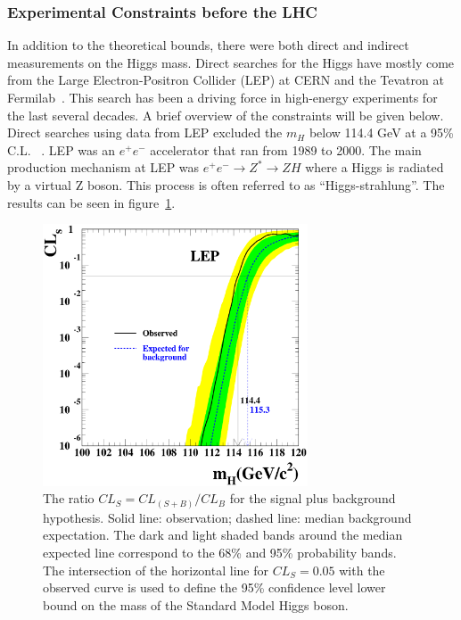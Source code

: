 \subsubsection{Experimental Constraints before the LHC}

In addition to the theoretical bounds, there were both direct and indirect measurements on the Higgs mass. Direct searches for the Higgs have mostly come from the Large Electron-Positron Collider (LEP) at CERN and the Tevatron at Fermilab~\cite{ALEPH:2010aa}. This search has been a driving force in high-energy experiments for the last several decades.  A brief overview of the constraints will be given below.
 Direct searches using data from LEP excluded the $m_H$ below 114.4 GeV at a 95\% C.L. ~\cite{Barate:2003sz}. LEP was an $e^+e^-$ accelerator that ran from 1989 to 2000. The main production mechanism at LEP was $e^+e^- \rightarrow Z^* \rightarrow ZH$ where a Higgs is radiated by a virtual Z boson.  This process is often referred to as ``Higgs-strahlung''.  The results can be seen in figure~\ref{fig:adlocls}.

\begin{figure}[htb]
\centering
\includegraphics[width=0.7\textwidth]{StandardModel/fig9.eps}
\caption{\small The ratio $CL_S=CL_{(S+B)}/CL_B$
 for the signal plus background hypothesis. Solid line: observation; dashed line:
median background expectation. The dark and light shaded bands around the median
expected line correspond to the 68\% and 95\% probability bands. The intersection of the horizontal line 
for 
$CL_S = 0.05$
 with the observed curve is used to define the 95\%
confidence level
lower bound on the mass of the Standard Model Higgs boson.~\cite{Barate:2003sz} }
\label{fig:adlocls}
\end{figure}

